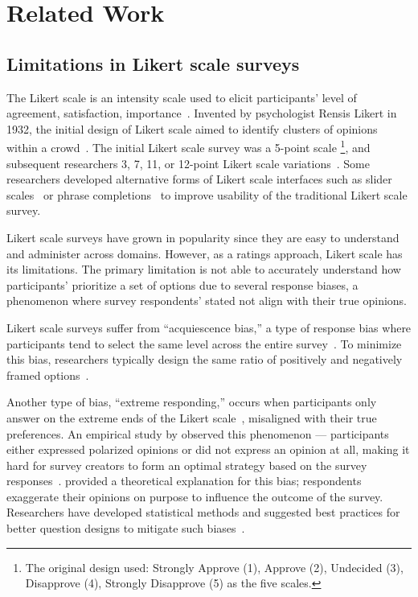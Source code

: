 \section{Related Work} \label{related_works}

\subsection{Limitations in Likert scale surveys}
The Likert scale is an intensity scale used to elicit participants' level of agreement, satisfaction, {} importance~\cite{likert1932technique}. Invented by psychologist Rensis Likert in 1932, the initial design of {} Likert scale aimed to identify clusters of opinions within a crowd~\cite{joshi2015likert}. The initial Likert scale survey was a 5-point scale \footnote{The original design used: Strongly Approve (1), Approve (2), Undecided (3), Disapprove (4), Strongly Disapprove (5) as the five scales.}, and subsequent researchers 3, 7, 11, or 12-point Likert scale variations~\cite{garland2008computer,finstad2010}. Some researchers developed alternative forms of Likert scale interfaces such as slider scales~\cite{roster2015exploring} or phrase completions~\cite{hodge2003phrase} to improve usability of the traditional Likert scale survey. 

Likert scale surveys have grown in popularity since they are easy to understand and administer across domains. However, as a ratings approach, Likert scale has its limitations. The primary limitation is not able to accurately understand how participants' prioritize a set of options due to several response biases, a phenomenon where survey respondents' stated {} not align with their true opinions. 

Likert scale surveys suffer from ``acquiescence bias,'' a type of response bias where participants tend to select the same level across the entire survey~\cite{alwin1985measurement, moors2016two}. To minimize this bias, researchers typically design the same ratio of positively and negatively framed options~\cite{kuru2016improving}. 

Another type of bias, ``extreme responding,'' occurs when participants only answer on the extreme ends of the Likert scale~\cite{batchelor2016extreme, furnham1986response, meisenberg2008acquiescent}, misaligned with their true preferences. An empirical study by \textcite{quarfoot2017quadratic} observed this phenomenon --- participants either expressed polarized opinions or did not express an opinion at all, making it hard for survey creators to form an optimal strategy based on the survey responses~\cite{posner2018radical}. \textcite{cavaille2018towards} provided a theoretical explanation for this bias; respondents exaggerate their opinions on purpose to influence the outcome of the survey. Researchers have developed statistical methods and suggested best practices for better question designs to mitigate such biases~\cite{glaser2008response}.

